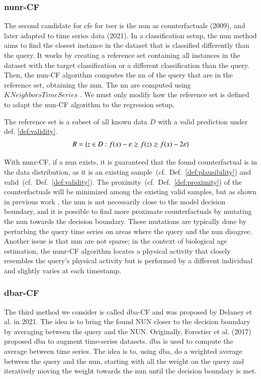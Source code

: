 \subsubsection{\gls{nunr}-CF}
\label{sec:methods:nun}
The second candidate for \gls{cfe} for \gls{tser} is the \gls{nun} as counterfactuals \cite{nugent_gaining_2009} (2009), and later adapted to time series data \cite{delaney_instance-based_2021} (2021). In a classification setup, the \gls{nun} method aims to find the closest instance in the dataset that is classified differently than the query. It works by creating a reference set containing all instances in the dataset with the target classification or a different classification than the query. Then, the \gls{nun}-CF algorithm computes the \gls{nn} of the query that are in the reference set, obtaining the \gls{nun}. The \gls{nn} are computed using $KNeighborsTimeSeries$ \cite{tavenard_tslearn_2020}.
We must only modify how the reference set is defined to adapt the \gls{nun}-CF algorithm to the regression setup.
\begin{definition}
    \label{def:ref-set}
    The reference set is a subset of all known data $D$ with a valid prediction under def. \ref{def:validity}.
    \[
        R = \{z \in D : f(x) - \varepsilon \geq f(z) \geq f(x) - 2\varepsilon\}
    \]
\end{definition}
With \gls{nunr}-CF, if a \gls{nun} exists, it is guaranteed that the found counterfactual is in the data distribution, as it is an existing sample~(cf.~Def.~\ref{def:plausibility}) and valid~(cf.~Def.~\ref{def:validity}). The proximity~(cf.~Def.~\ref{def:proximity}) of the counterfactuals will be minimized among the existing valid samples, but as shown in previous work \cite{delaney_instance-based_2021, hagen_dice_2020}, the \gls{nun} is not necessarily close to the model decision boundary, and it is possible to find more proximate counterfactuals by mutating the \gls{nun} towards the decision boundary. These mutations are typically done by perturbing the query time series on areas where the query and the \gls{nun} disagree. Another issue is that \gls{nun} are not sparse; in the context of biological age estimation, the \gls{nunr}-CF algorithm locates a physical activity that closely resembles the query's physical activity but is performed by a different individual and slightly varies at each timestamp.

\subsubsection{\gls{dbar}-CF}
\label{sec:methods:dbar}
The third method we consider is called \gls{dba}-CF and was proposed by Delaney et al. \cite{delaney_instance-based_2021} in 2021. The idea is to bring the found NUN closer to the decision boundary by averaging between the query and the NUN. Originally, Forestier et al. \cite{forestier_generating_2017} (2017) proposed \gls{dba} to augment time-series datasets. \gls{dba} is used to compute the average between time series. The idea is to, using \gls{dba}, do a weighted average between the query and the \gls{nun}, starting with all the weight on the query and iteratively moving the weight towards the \gls{nun} until the decision boundary is met.
